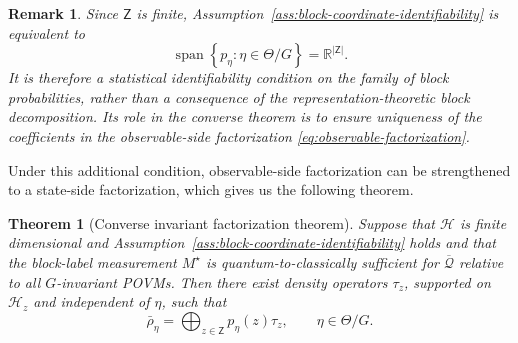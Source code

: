 \documentclass{article}
\newtheorem{theorem}{Theorem}[section]
\newtheorem{lemma}[theorem]{Lemma}
\newtheorem{remark}{Remark}
\theoremstyle{named}
\theoremstyle{named1}
\newcommand{\cQ}{\mathcal Q}
\newcommand{\cA}{\mathcal A}
\newcommand{\cH}{\mathcal H}
\theoremstyle{plain}
\theoremstyle{remark}
\begin{document}
\begin{remark}
\label{rem:block-coordinate-identifiability}
Since $\mathsf Z$ is finite,
Assumption~\ref{ass:block-coordinate-identifiability} is equivalent to
\[
    \operatorname{span}
    \left\{
        p_\eta:\eta\in\Theta/G
    \right\}
    =
    \mathbb R^{|\mathsf Z|}.
\]
It is therefore a statistical identifiability condition on the family of
block probabilities, rather than a consequence of the representation-theoretic
block decomposition. Its role in the converse theorem is to ensure uniqueness
of the coefficients in the observable-side factorization
\eqref{eq:observable-factorization}. 
\end{remark}


Under this additional condition, observable-side factorization can be strengthened
to a state-side factorization, which gives us the following theorem.

\begin{theorem}[Converse invariant factorization theorem]
\label{thm:converse-invariant-factorization}
Suppose that $\cH$ is finite dimensional and Assumption~\ref{ass:block-coordinate-identifiability} holds and
that the block-label measurement $M^\star$ is quantum-to-classically sufficient
for $\overline{\cQ}$ relative to all $G$-invariant POVMs. Then there exist
density operators $\tau_z$, supported on $\cH_z$ and independent of $\eta$,
such that
\begin{equation}
    \bar\rho_\eta
    =
    \bigoplus_{z\in\mathsf Z}
    p_\eta(z)\tau_z,
    \qquad
    \eta\in\Theta/G.
   \label{eq:converse-factorization}
\end{equation}
\end{theorem}


\end{document}
